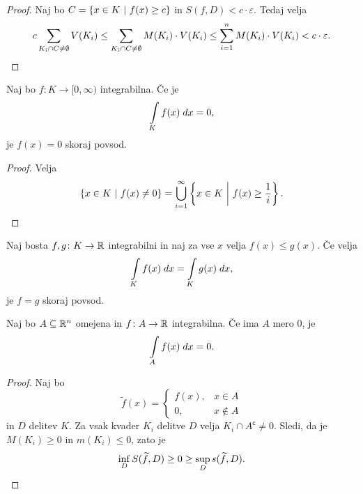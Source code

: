 \begin{proof}
Naj bo $C = \left\{x \in K~\middle\vert~f(x) \geq c\right\}$ in
$S(f,D) < c \cdot \varepsilon$. Tedaj velja
\[
c \sum_{K_i \cap C \ne \emptyset} V(K_i) \leq
\sum_{K_i \cap C \ne \emptyset} M(K_i) \cdot V(K_i) \leq
\sum_{i=1}^n M(K_i) \cdot V(K_i) <
c \cdot \varepsilon. \qedhere
\]
\end{proof}

\begin{posledica}
Naj bo $f \colon K \to [0,\infty)$ integrabilna. Če je
\[
\int\limits_K f(x)\;dx = 0,
\]
je $f(x) = 0$ skoraj povsod.
\end{posledica}

\begin{proof}
Velja
\[
\left\{x \in K~\middle\vert~f(x) \ne 0\right\} =
\bigcup_{i=1}^\infty \left\{x \in K~\middle\vert~f(x) \geq \frac{1}{i}\right\}.
\qedhere
\]
\end{proof}

\begin{posledica}
Naj bosta $f,g \colon K \to \mathbb{R}$ integrabilni in naj za vse $x$
velja $f(x) \leq g(x)$. Če velja
\[
\int\limits_K f(x)\;dx = \int\limits_K g(x)\;dx,
\]
je $f=g$ skoraj povsod.
\end{posledica}

\begin{trditev}
Naj bo $A \subseteq \mathbb{R}^n$ omejena in $f \colon A \to \mathbb{R}$
integrabilna. Če ima $A$ mero $0$, je
\[
\int\limits_A f(x)\;dx = 0.
\]
\end{trditev}

\begin{proof}
Naj bo
\[
\widetilde{f}(x) = \begin{cases}
f(x), &x \in A
\\
0, &x \not \in A
\end{cases}
\]
in $D$ delitev $K$. Za vsak kvader $K_i$ delitve $D$ velja
$K_i \cap A^\mathsf{c} \ne 0$. Sledi, da je $M(K_i) \geq 0$ in
$m(K_i) \leq 0$, zato je
\[
\inf_D S(\widetilde{f},D) \geq 0 \geq \sup_D s(\widetilde{f},D).
\qedhere
\]
\end{proof}


